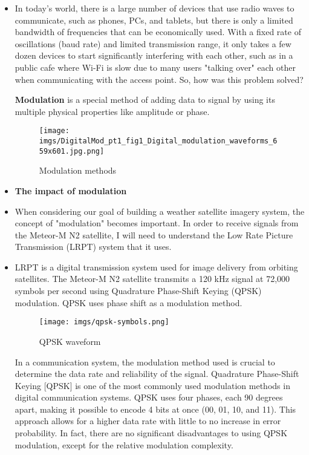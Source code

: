 \documentclass{article}
\begin{document}
\begin{itemize}
            \item[] In today's world, there is a large number of devices that use radio waves to communicate, such as phones, PCs, and tablets, but there is only a limited bandwidth of frequencies that can be economically used. With a fixed rate of oscillations (baud rate) and limited transmission range, it only takes a few dozen devices to start significantly interfering with each other, such as in a public cafe where Wi-Fi is slow due to many users "talking over" each other when communicating with the access point. So, how was this problem solved?

            \textbf{Modulation} is a special method of adding data to signal by using its multiple physical properties like amplitude or phase.

            \begin{figure}[H]
                \centering
                \texttt{[image: imgs/DigitalMod\_pt1\_fig1\_Digital\_modulation\_waveforms\_659x601.jpg.png]}
                \caption{Modulation methods \cite{7}}
                \label{mod-type-img}
            \end{figure}

            
            
            \item[] \textbf{The impact of modulation}
            
            \item[] When considering our goal of building a weather satellite imagery system, the concept of "modulation" becomes important. In order to receive signals from the Meteor-M N2 satellite, I will need to understand the Low Rate Picture Transmission (LRPT) system that it uses. 

            \item[] LRPT\cite{7} is a digital transmission system used for image delivery from orbiting satellites. The Meteor-M N2 satellite transmits a 120 kHz signal at 72,000 symbols per second using Quadrature Phase-Shift Keying (QPSK) modulation. QPSK uses phase shift as a modulation method.

            \begin{figure}[H]
                \centering
                \texttt{[image: imgs/qpsk-symbols.png]}
                \caption{QPSK waveform \cite{8}}
                \label{mod-type-img}
            \end{figure}

            In a communication system, the modulation method used is crucial to determine the data rate and reliability of the signal. Quadrature Phase-Shift Keying [QPSK] is one of the most commonly used modulation methods in digital communication systems. QPSK uses four phases, each 90 degrees apart, making it possible to encode 4 bits at once (00, 01, 10, and 11). This approach allows for a higher data rate with little to no increase in error probability. In fact, there are no significant disadvantages to using QPSK modulation, except for the relative modulation complexity.




\end{itemize}
\end{document}
